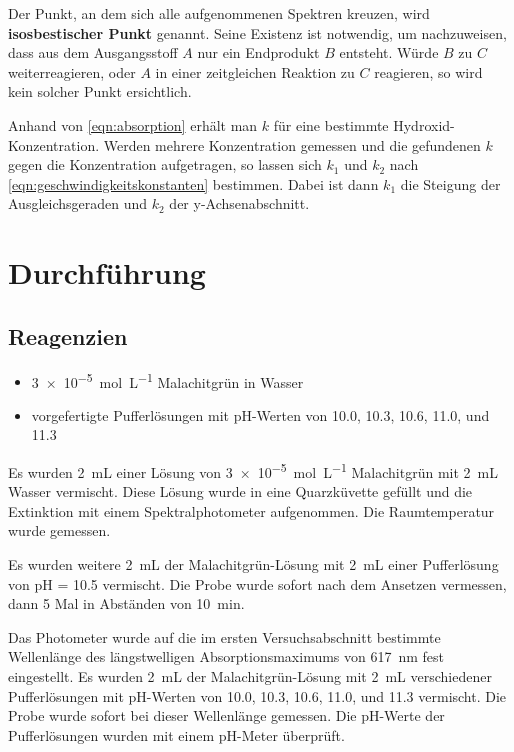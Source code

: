 Der Punkt, an dem sich alle aufgenommenen Spektren kreuzen, wird \textbf{isosbestischer Punkt} genannt.
Seine Existenz ist notwendig, um nachzuweisen, dass aus dem Ausgangsstoff $A$ nur ein Endprodukt $B$ entsteht.
Würde $B$ zu $C$ weiterreagieren, oder $A$ in einer zeitgleichen Reaktion zu $C$ reagieren, so wird kein solcher Punkt ersichtlich.

Anhand von \autoref{eqn:absorption} erhält man $k$ für eine bestimmte Hydroxid-Konzentration.
Werden mehrere Konzentration gemessen und die gefundenen $k$ gegen die Konzentration aufgetragen, so lassen sich $k_1$ und $k_2$ nach \autoref{eqn:geschwindigkeitskonstanten} bestimmen.
Dabei ist dann $k_1$ die Steigung der Ausgleichsgeraden und $k_2$ der y-Achsenabschnitt.

\section{Durchführung}
\subsection{Reagenzien}
\begin{itemize}
    \item \qty{3e-5}{\mol\per\liter} Malachitgrün in Wasser
    \item vorgefertigte Pufferlösungen mit pH-Werten von \num{10.0}, \num{10.3}, \num{10.6}, \num{11.0}, und \num{11.3}
\end{itemize}

Es wurden \qty{2}{\milli\liter} einer Lösung von \qty{3e-5}{\mol\per\liter} Malachitgrün mit \qty{2}{\milli\liter} Wasser vermischt.
Diese Lösung wurde in eine Quarzküvette gefüllt und die Extinktion mit einem Spektralphotometer aufgenommen.
Die Raumtemperatur wurde gemessen.

Es wurden weitere \qty{2}{\milli\liter} der Malachitgrün-Lösung mit \qty{2}{\milli\liter} einer Pufferlösung von pH = 10.5 vermischt.
Die Probe wurde sofort nach dem Ansetzen vermessen, dann 5 Mal in Abständen von \qty{10}{\minute}.

Das Photometer wurde auf die im ersten Versuchsabschnitt bestimmte Wellenlänge des längstwelligen Absorptionsmaximums von \qty{617}{\nano\meter} fest eingestellt.
Es wurden \qty{2}{\milli\liter} der Malachitgrün-Lösung mit \qty{2}{\milli\liter} verschiedener Pufferlösungen mit pH-Werten von \num{10.0}, \num{10.3}, \num{10.6}, \num{11.0}, und \num{11.3} vermischt.
Die Probe wurde sofort bei dieser Wellenlänge gemessen.
Die pH-Werte der Pufferlösungen wurden mit einem pH-Meter überprüft.

